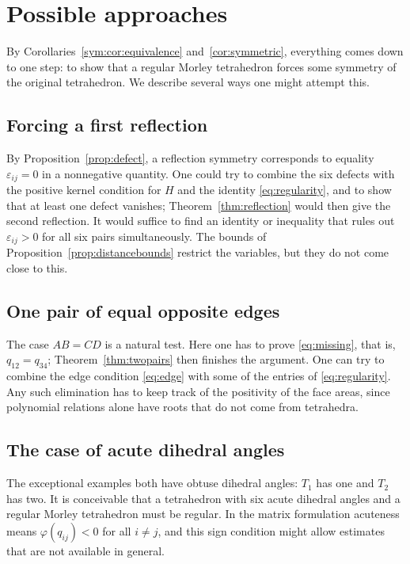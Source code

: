 \documentclass[11pt]{article}
\theoremstyle{definition}
\theoremstyle{remark}
\newcommand{\ph}{\varphi}
\begin{document}
\section{Possible approaches}
\label{tet:directions}

By Corollaries~\ref{sym:cor:equivalence} and~\ref{cor:symmetric}, everything comes down to one step: to show that a regular Morley tetrahedron forces some symmetry of the original tetrahedron. We describe several ways one might attempt this.

\subsection{Forcing a first reflection}

By Proposition~\ref{prop:defect}, a reflection symmetry corresponds to equality $\varepsilon_{ij}=0$ in a nonnegative quantity. One could try to combine the six defects with the positive kernel condition for $H$ and the identity \eqref{eq:regularity}, and to show that at least one defect vanishes; Theorem~\ref{thm:reflection} would then give the second reflection. It would suffice to find an identity or inequality that rules out $\varepsilon_{ij}>0$ for all six pairs simultaneously. The bounds of Proposition~\ref{prop:distancebounds} restrict the variables, but they do not come close to this.

\subsection{One pair of equal opposite edges}

The case $AB=CD$ is a natural test. Here one has to prove \eqref{eq:missing}, that is, $q_{12}=q_{34}$; Theorem~\ref{thm:twopairs} then finishes the argument. One can try to combine the edge condition \eqref{eq:edge} with some of the entries of \eqref{eq:regularity}. Any such elimination has to keep track of the positivity of the face areas, since polynomial relations alone have roots that do not come from tetrahedra.

\subsection{The case of acute dihedral angles}

The exceptional examples both have obtuse dihedral angles: $T_1$ has one and $T_2$ has two. It is conceivable that a tetrahedron with six acute dihedral angles and a regular Morley tetrahedron must be regular. In the matrix formulation acuteness means $\ph(q_{ij})<0$ for all $i\ne j$, and this sign condition might allow estimates that are not available in general.
\end{document}
